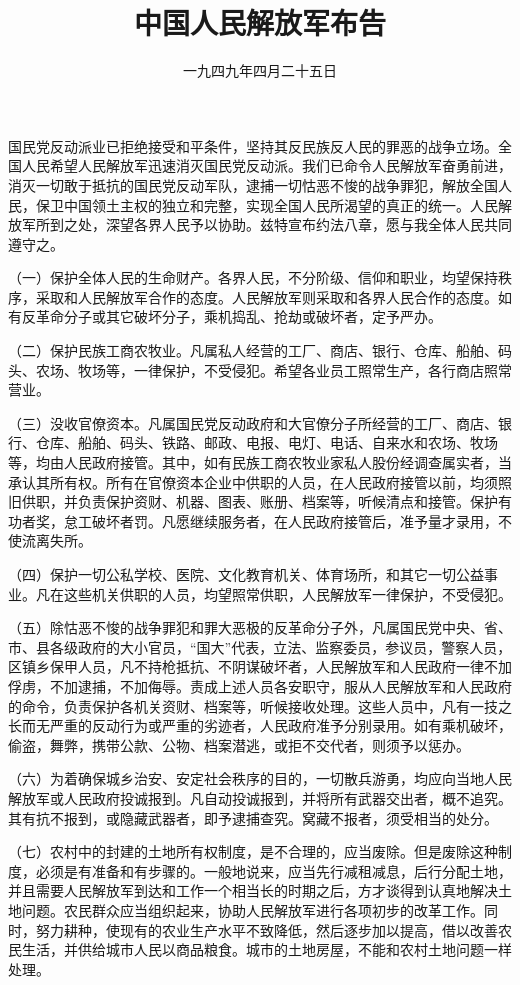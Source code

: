 
\title{中国人民解放军布告}
\date{一九四九年四月二十五日}
\maketitle


国民党反动派业已拒绝接受和平条件，坚持其反民族反人民的罪恶的战争立场。全国人民希望人民解放军迅速消灭国民党反动派。我们已命令人民解放军奋勇前进，消灭一切敢于抵抗的国民党反动军队，逮捕一切怙恶不悛的战争罪犯，解放全国人民，保卫中国领土主权的独立和完整，实现全国人民所渴望的真正的统一。人民解放军所到之处，深望各界人民予以协助。兹特宣布约法八章，愿与我全体人民共同遵守之。

（一）保护全体人民的生命财产。各界人民，不分阶级、信仰和职业，均望保持秩序，采取和人民解放军合作的态度。人民解放军则采取和各界人民合作的态度。如有反革命分子或其它破坏分子，乘机捣乱、抢劫或破坏者，定予严办。

（二）保护民族工商农牧业。凡属私人经营的工厂、商店、银行、仓库、船舶、码头、农场、牧场等，一律保护，不受侵犯。希望各业员工照常生产，各行商店照常营业。

（三）没收官僚资本。凡属国民党反动政府和大官僚分子所经营的工厂、商店、银行、仓库、船舶、码头、铁路、邮政、电报、电灯、电话、自来水和农场、牧场等，均由人民政府接管。其中，如有民族工商农牧业家私人股份经调查属实者，当承认其所有权。所有在官僚资本企业中供职的人员，在人民政府接管以前，均须照旧供职，并负责保护资财、机器、图表、账册、档案等，听候清点和接管。保护有功者奖，怠工破坏者罚。凡愿继续服务者，在人民政府接管后，准予量才录用，不使流离失所。

（四）保护一切公私学校、医院、文化教育机关、体育场所，和其它一切公益事业。凡在这些机关供职的人员，均望照常供职，人民解放军一律保护，不受侵犯。

（五）除怙恶不悛的战争罪犯和罪大恶极的反革命分子外，凡属国民党中央、省、市、县各级政府的大小官员，“国大”代表，立法、监察委员，参议员，警察人员，区镇乡保甲人员，凡不持枪抵抗、不阴谋破坏者，人民解放军和人民政府一律不加俘虏，不加逮捕，不加侮辱。责成上述人员各安职守，服从人民解放军和人民政府的命令，负责保护各机关资财、档案等，听候接收处理。这些人员中，凡有一技之长而无严重的反动行为或严重的劣迹者，人民政府准予分别录用。如有乘机破坏，偷盗，舞弊，携带公款、公物、档案潜逃，或拒不交代者，则须予以惩办。

（六）为着确保城乡治安、安定社会秩序的目的，一切散兵游勇，均应向当地人民解放军或人民政府投诚报到。凡自动投诚报到，并将所有武器交出者，概不追究。其有抗不报到，或隐藏武器者，即予逮捕查究。窝藏不报者，须受相当的处分。

（七）农村中的封建的土地所有权制度，是不合理的，应当废除。但是废除这种制度，必须是有准备和有步骤的。一般地说来，应当先行减租减息，后行分配土地，并且需要人民解放军到达和工作一个相当长的时期之后，方才谈得到认真地解决土地问题。农民群众应当组织起来，协助人民解放军进行各项初步的改革工作。同时，努力耕种，使现有的农业生产水平不致降低，然后逐步加以提高，借以改善农民生活，并供给城市人民以商品粮食。城市的土地房屋，不能和农村土地问题一样处理。

